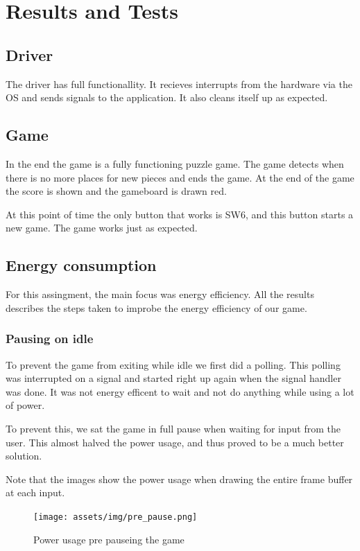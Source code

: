 \section{Results and Tests}

\subsection{Driver}
The driver has full functionallity.
It recieves interrupts from the hardware via the OS and sends signals to the application.
It also cleans itself up as expected.

\subsection{Game}
In the end the game is a fully functioning puzzle game.
The game detects when there is no more places for new pieces and ends the game.
At the end of the game the score is shown and the gameboard is drawn red.

At this point of time the only button that works is SW6, and this button starts a new game.
The game works just as expected.

\subsection{Energy consumption}
For this assingment, the main focus was energy efficiency.
All the results describes the steps taken to improbe the energy efficiency of our game.

\subsubsection{Pausing on idle}
To prevent the game from exiting while idle we first did a polling.
This polling was interrupted on a signal and started right up again when the signal handler was done.
It was not energy efficent to wait and not do anything while using a lot of power.

To prevent this, we sat the game in full pause when waiting for input from the user.
This almost halved the power usage, and thus proved to be a much better solution.

Note that the images show the power usage when drawing the entire frame buffer at each input.

\begin{figure}[ht!]
    \begin{center}
    \texttt{[image: assets/img/pre\_pause.png]}
    \caption{Power usage pre pauseing the game}
    \label{fig:idle}
    \end{center}
\end{figure}

